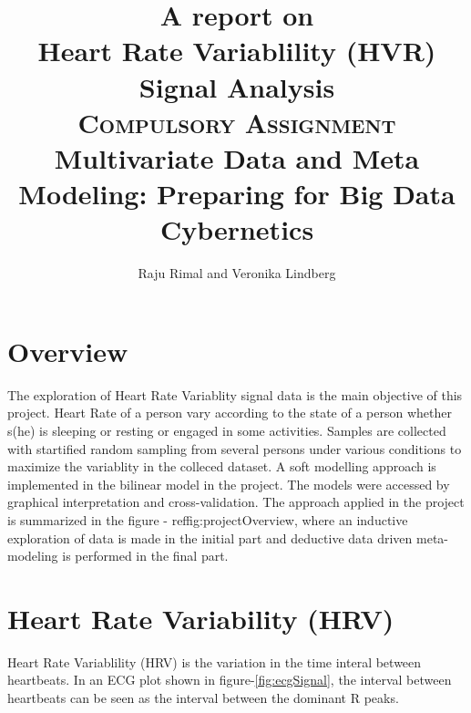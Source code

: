 \documentclass[a4paper, 11pt]{report}\usepackage[]{graphicx}\usepackage[]{color}
\title{\Large{A report on} \\ \vspace{0.5cm}
Heart Rate Variablility (HVR) Signal Analysis \\ \vfill 
\Large{\textsc{Compulsory Assignment} \\ \vspace{1cm}
Multivariate Data and Meta Modeling: Preparing for Big Data Cybernetics} \vfill}
\author{Raju Rimal and Veronika Lindberg}
\numberwithin{figure}{section}
\begin{document}
\maketitle
\tableofcontents

\chapter{Overview}
The exploration of Heart Rate Variablity signal data is the main objective of this project. Heart Rate of a person vary according to the state of a person whether s(he) is sleeping or resting or engaged in some activities. Samples are collected with startified random sampling from several persons under various conditions to maximize the variablity in the colleced dataset. A soft modelling approach is implemented in the bilinear model in the project. The models were accessed by graphical interpretation and cross-validation. The approach applied in the project is summarized in the figure - ref{fig:projectOverview}, where an inductive exploration of data is made in the initial part and deductive data driven meta-modeling is performed in the final part.


\chapter{Heart Rate Variability (HRV)}
Heart Rate Variablility (HRV) is the variation in the time interal between heartbeats. In an ECG plot shown in figure-\ref{fig:ecgSignal}, the interval between heartbeats can be seen as the interval between the dominant R peaks.
\end{document}
